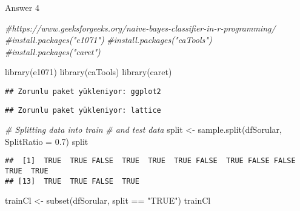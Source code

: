 \documentclass[
]{article}
\newenvironment{Shaded}{\begin{snugshade}}{\end{snugshade}}
\newcommand{\AttributeTok}[1]{\textcolor[rgb]{0.77,0.63,0.00}{#1}}
\newcommand{\CommentTok}[1]{\textcolor[rgb]{0.56,0.35,0.01}{\textit{#1}}}
\newcommand{\FloatTok}[1]{\textcolor[rgb]{0.00,0.00,0.81}{#1}}
\newcommand{\FunctionTok}[1]{\textcolor[rgb]{0.00,0.00,0.00}{#1}}
\newcommand{\NormalTok}[1]{#1}
\newcommand{\OtherTok}[1]{\textcolor[rgb]{0.56,0.35,0.01}{#1}}
\newcommand{\SpecialCharTok}[1]{\textcolor[rgb]{0.00,0.00,0.00}{#1}}
\newcommand{\StringTok}[1]{\textcolor[rgb]{0.31,0.60,0.02}{#1}}
\begin{document}
Answer 4

\begin{Shaded}
\begin{Highlighting}[]
\CommentTok{\#https://www.geeksforgeeks.org/naive{-}bayes{-}classifier{-}in{-}r{-}programming/}
\CommentTok{\#install.packages("e1071")}
\CommentTok{\#install.packages("caTools")}
\CommentTok{\#install.packages("caret")}

\FunctionTok{library}\NormalTok{(e1071)}
\FunctionTok{library}\NormalTok{(caTools)}
\FunctionTok{library}\NormalTok{(caret)}
\end{Highlighting}
\end{Shaded}

\begin{verbatim}
## Zorunlu paket yükleniyor: ggplot2
\end{verbatim}

\begin{verbatim}
## Zorunlu paket yükleniyor: lattice
\end{verbatim}

\begin{Shaded}
\begin{Highlighting}[]
\CommentTok{\# Splitting data into train}
\CommentTok{\# and test data}
\NormalTok{split }\OtherTok{\textless{}{-}} \FunctionTok{sample.split}\NormalTok{(dfSorular, }\AttributeTok{SplitRatio =} \FloatTok{0.7}\NormalTok{)}
\NormalTok{split}
\end{Highlighting}
\end{Shaded}

\begin{verbatim}
##  [1]  TRUE  TRUE FALSE  TRUE  TRUE  TRUE FALSE  TRUE FALSE FALSE  TRUE  TRUE
## [13]  TRUE  TRUE FALSE  TRUE
\end{verbatim}

\begin{Shaded}
\begin{Highlighting}[]
\NormalTok{trainCl }\OtherTok{\textless{}{-}} \FunctionTok{subset}\NormalTok{(dfSorular, split }\SpecialCharTok{==} \StringTok{"TRUE"}\NormalTok{)}
\NormalTok{trainCl}
\end{Highlighting}
\end{Shaded}
\end{document}
